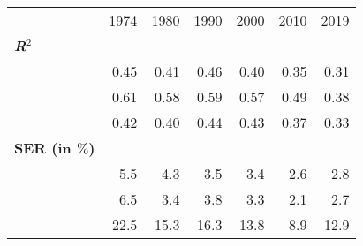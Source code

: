 \begin{tabular}{lllllll}
\cline{1-7}
\multicolumn{1}{c}{} &
  \multicolumn{1}{|r}{1974} &
  \multicolumn{1}{r}{1980} &
  \multicolumn{1}{r}{1990} &
  \multicolumn{1}{r}{2000} &
  \multicolumn{1}{r}{2010} &
  \multicolumn{1}{r}{2019} \\
\cline{1-7}
\multicolumn{1}{l}{\textbf{\textit{R}$^2$}} &
  \multicolumn{1}{|r}{} &
  \multicolumn{1}{r}{} &
  \multicolumn{1}{r}{} &
  \multicolumn{1}{r}{} &
  \multicolumn{1}{r}{} &
  \multicolumn{1}{r}{} \\
\multicolumn{1}{l}{\hspace{1em}{Model (A)}} &
  \multicolumn{1}{|r}{0.45} &
  \multicolumn{1}{r}{0.41} &
  \multicolumn{1}{r}{0.46} &
  \multicolumn{1}{r}{0.40} &
  \multicolumn{1}{r}{0.35} &
  \multicolumn{1}{r}{0.31} \\
\multicolumn{1}{l}{\hspace{1em}{Model (B)}} &
  \multicolumn{1}{|r}{0.61} &
  \multicolumn{1}{r}{0.58} &
  \multicolumn{1}{r}{0.59} &
  \multicolumn{1}{r}{0.57} &
  \multicolumn{1}{r}{0.49} &
  \multicolumn{1}{r}{0.38} \\
\multicolumn{1}{l}{\hspace{1em}{Model (C)}} &
  \multicolumn{1}{|r}{0.42} &
  \multicolumn{1}{r}{0.40} &
  \multicolumn{1}{r}{0.44} &
  \multicolumn{1}{r}{0.43} &
  \multicolumn{1}{r}{0.37} &
  \multicolumn{1}{r}{0.33} \\
\multicolumn{1}{l}{\textbf{SER (in $\%$)}} &
  \multicolumn{1}{|r}{} &
  \multicolumn{1}{r}{} &
  \multicolumn{1}{r}{} &
  \multicolumn{1}{r}{} &
  \multicolumn{1}{r}{} &
  \multicolumn{1}{r}{} \\
\multicolumn{1}{l}{\hspace{1em}{Model (A)}} &
  \multicolumn{1}{|r}{5.5} &
  \multicolumn{1}{r}{4.3} &
  \multicolumn{1}{r}{3.5} &
  \multicolumn{1}{r}{3.4} &
  \multicolumn{1}{r}{2.6} &
  \multicolumn{1}{r}{2.8} \\
\multicolumn{1}{l}{\hspace{1em}{Model (B)}} &
  \multicolumn{1}{|r}{6.5} &
  \multicolumn{1}{r}{3.4} &
  \multicolumn{1}{r}{3.8} &
  \multicolumn{1}{r}{3.3} &
  \multicolumn{1}{r}{2.1} &
  \multicolumn{1}{r}{2.7} \\
\multicolumn{1}{l}{\hspace{1em}{Model (C)}} &
  \multicolumn{1}{|r}{22.5} &
  \multicolumn{1}{r}{15.3} &
  \multicolumn{1}{r}{16.3} &
  \multicolumn{1}{r}{13.8} &
  \multicolumn{1}{r}{8.9} &
  \multicolumn{1}{r}{12.9} \\

\end{tabular}
